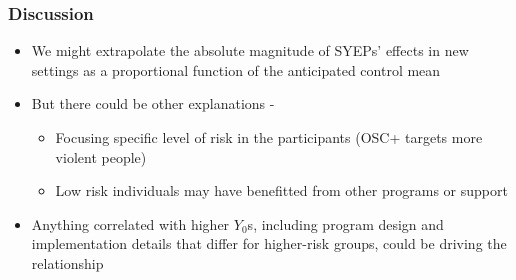 \documentclass{beamer}
\begin{document}
\begin{frame}
\frametitle{Discussion}
\begin{itemize}
\item  We might extrapolate the absolute magnitude of SYEPs’ effects in new settings as a proportional function of the anticipated control mean
\item But there could be other explanations -
\begin{itemize}
  \item Focusing specific level of risk in the participants (OSC+ targets more violent people)
  \item Low risk individuals may have benefitted from other programs or support
\end{itemize}
\item Anything correlated with higher $Y_0$s, including program design and implementation details that differ for higher-risk groups, could be driving the relationship
\end{itemize}
\end{frame}
\end{document}
